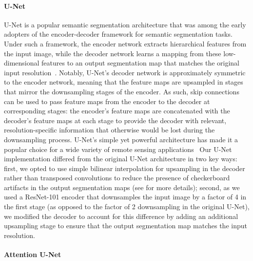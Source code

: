 \paragraph{U-Net}
U-Net is a popular semantic segmentation architecture that was among the early adopters of the encoder-decoder framework for semantic segmentation tasks. 
Under such a framework, the encoder network extracts hierarchical features from the input image, while the decoder network learns a mapping from these low-dimensional features to an output segmentation map that matches the original input resolution~\citep{ronnebergerUNetConvolutionalNetworks2015}.
Notably, U-Net's decoder network is approximately symmetric to the encoder network, meaning that the feature maps are upsampled in stages that mirror the downsampling stages of the encoder.
As such, skip connections can be used to pass feature maps from the encoder to the decoder at corresponding stages: the encoder's feature maps are concatenated with the decoder's feature maps at each stage to provide the decoder with relevant, resolution-specific information that otherwise would be lost during the downsampling process.
U-Net's simple yet powerful architecture has made it a popular choice for a wide variety of remote sensing applications~\citep{robinsonLargeScaleHighresolution2019,yiSemanticSegmentationUrban2019, liDeepUNetDeepFully2018, schieferMappingForestTree2020}
Our U-Net implementation differed from the original U-Net architecture in two key ways: first, we opted to use simple bilinear interpolation for upsampling in the decoder rather than transposed convolutions to reduce the presence of checkerboard artifacts in the output segmentation maps (see \citep{odenaDeconvolutionCheckerboardArtifacts2016} for more details); second, as we used a ResNet-101 encoder that downsamples the input image by a factor of 4 in the first stage (as opposed to the factor of 2 downsampling in the original U-Net), we modified the decoder to account for this difference by adding an additional upsampling stage to ensure that the output segmentation map matches the input resolution.

% 

\paragraph{Attention U-Net}


